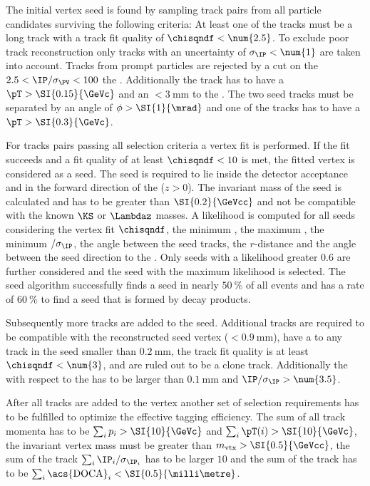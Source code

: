 The initial vertex seed is found by sampling track pairs from all particle
candidates surviving the following criteria: At least one of the tracks must be
a long track with a track fit quality of $\chisqndf<\num{2.5}$. To exclude poor
track reconstruction only tracks with an \IP uncertainty of
$\sigma_\text{\IP}<\num{1}$ are taken into account. Tracks from prompt particles
are rejected by a cut on the $2.5<\text{\IP}/\sigma_\text{\PV}<100$ \wrt the
\PV. Additionally the track has to have a $\pT>\SI{0.15}{\GeVc}$ and an
\IP$<\SI{3}{\milli\metre}$ \wrt to the \PV. The two seed tracks must be separated by an angle of
$\phi>\SI{1}{\mrad}$ and one of the tracks has to have a $\pT>\SI{0.3}{\GeVc}$.

For tracks pairs passing all selection criteria a vertex fit is performed. If
the fit succeeds and a fit quality of at least $\chisqndf<10$ is met, the fitted
vertex is considered as a seed. The seed is required to lie inside the detector
acceptance and in the forward direction of the \PV ($z>0$).  The invariant mass of the seed is calculated and has to be greater
than $\SI{0.2}{\GeVcc}$ and not be compatible with the known $\KS$ or $\Lambdaz$
masses. %
A likelihood is computed for all seeds considering the vertex fit $\chisqndf$,
the minimum \pT, the maximum \PV \IP, the minimum \PV \IP$/\sigma_\text{\IP}$,
the angle between the seed tracks, the $r$-distance and the angle between the
seed direction \wrt to the \PV. Only seeds with a likelihood greater $\num{0.6}$
are further considered and the seed with the maximum likelihood is selected. The
seed algorithm successfully finds a seed in nearly $\SI{50}{\percent}$ of all
events and has a rate of $\SI{60}{\percent}$ to find a seed that is formed by
\bhadron decay products.

Subsequently more tracks are added to the seed. Additional tracks are required
to be compatible with the reconstructed seed vertex
(\IP$<\SI{0.9}{\milli\metre}$), have a \DOCA to any track in the seed smaller
than $\SI{0.2}{\milli\metre}$, the track fit quality is at least
$\chisqndf<\num{3}$, and are ruled out to be a clone track. Additionally the \IP
with respect to the \PV has to be larger than $\SI{0.1}{\milli\metre}$ and
$\text{\IP}/\sigma_\text{\IP}>\num{3.5}$.

After all tracks are added to the vertex another set of selection requirements
has to be fulfilled to optimize the effective tagging efficiency. The sum of all
track momenta has to be $\sum_i p_i > \SI{10}{\GeVc}$ and $\sum_i \pT(i) >
\SI{10}{\GeVc}$, the invariant vertex mass must be greater than $m_\text{vtx} >
\SI{0.5}{\GeVcc}$, the sum of the track
$\sum_i\text{\IP}_i/\sigma_{\text{\IP}_i}$ has to be larger $\num{10}$ and the
sum of the track \DOCA has to be $\sum_i\text{\acs{DOCA}}_i <
\SI{0.5}{\milli\metre}$.

